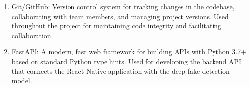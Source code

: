 \begin{enumerate}
    \item Git/GitHub:
          Version control system for tracking changes in the codebase, collaborating with team members, and managing project versions.
          Used throughout the project for maintaining code integrity and facilitating collaboration.

    \item FastAPI:
          A modern, fast web framework for building APIs with Python 3.7+ based on standard Python type hints.
          Used for developing the backend API that connects the React Native application with the deep fake detection model.
\end{enumerate}

\newpage